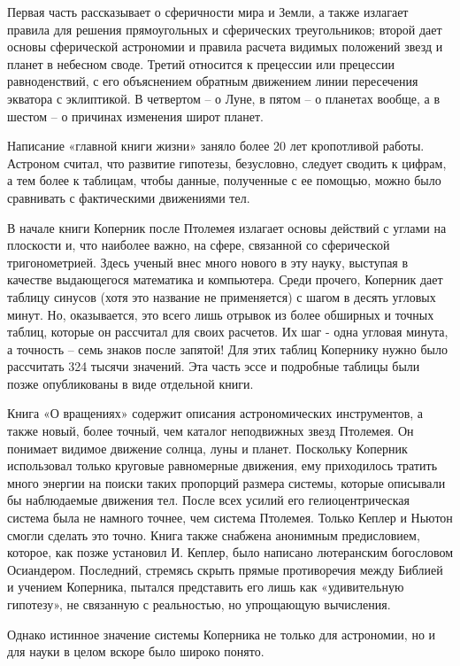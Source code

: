\documentclass[
]{article}
\begin{document}
Первая часть рассказывает о сферичности мира и Земли, а также излагает
правила для решения прямоугольных и сферических треугольников; второй
дает основы сферической астрономии и правила расчета видимых положений
звезд и планет в небесном своде. Третий относится к прецессии или
прецессии равноденствий, с его объяснением обратным движением линии
пересечения экватора с эклиптикой. В четвертом -- о Луне, в пятом -- о
планетах вообще, а в шестом -- о причинах изменения широт планет.

Написание «главной книги жизни» заняло более 20 лет кропотливой работы.
Астроном считал, что развитие гипотезы, безусловно, следует сводить к
цифрам, а тем более к таблицам, чтобы данные, полученные с ее помощью,
можно было сравнивать с фактическими движениями тел.

В начале книги Коперник после Птолемея излагает основы действий с углами
на плоскости и, что наиболее важно, на сфере, связанной со сферической
тригонометрией. Здесь ученый внес много нового в эту науку, выступая в
качестве выдающегося математика и компьютера. Среди прочего, Коперник
дает таблицу синусов (хотя это название не применяется) с шагом в десять
угловых минут. Но, оказывается, это всего лишь отрывок из более обширных
и точных таблиц, которые он рассчитал для своих расчетов. Их шаг - одна
угловая минута, а точность -- семь знаков после запятой! Для этих таблиц
Копернику нужно было рассчитать 324 тысячи значений. Эта часть эссе и
подробные таблицы были позже опубликованы в виде отдельной книги.

Книга «О вращениях» содержит описания астрономических инструментов, а
также новый, более точный, чем каталог неподвижных звезд Птолемея. Он
понимает видимое движение солнца, луны и планет. Поскольку Коперник
использовал только круговые равномерные движения, ему приходилось
тратить много энергии на поиски таких пропорций размера системы, которые
описывали бы наблюдаемые движения тел. После всех усилий его
гелиоцентрическая система была не намного точнее, чем система Птолемея.
Только Кеплер и Ньютон смогли сделать это точно. Книга также снабжена
анонимным предисловием, которое, как позже установил И. Кеплер, было
написано лютеранским богословом Осиандером. Последний, стремясь скрыть
прямые противоречия между Библией и учением Коперника, пытался
представить его лишь как «удивительную гипотезу», не связанную с
реальностью, но упрощающую вычисления.

Однако истинное значение системы Коперника не только для астрономии, но
и для науки в целом вскоре было широко понято.
\end{document}
